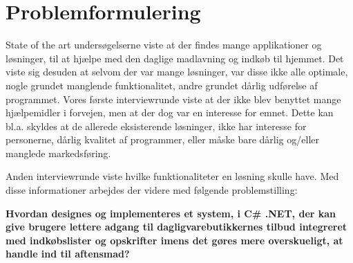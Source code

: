 \section{Problemformulering}\label{section:problemformulering}

State of the art undersøgelserne  viste at der findes mange applikationer og løsninger, til at hjælpe med den daglige madlavning og indkøb til hjemmet.
Det viste sig desuden at selvom der var mange løsninger, var disse ikke alle optimale, nogle grundet manglende funktionalitet, andre grundet dårlig udførelse af programmet.
Vores første interviewrunde viste at der ikke blev benyttet mange hjælpemidler i forvejen, men at der dog var en interesse for emnet.
Dette kan bl.a. skyldes at de allerede eksisterende løsninger, ikke har interesse for personerne, dårlig kvalitet af programmer, eller måske bare dårlig og/eller manglede markedsføring. 

Anden interviewrunde viste hvilke funktionaliteter en løsning skulle have.
Med disse informationer arbejdes der videre med følgende problemstilling:


\textbf{Hvordan designes og implementeres et system, i C\# .NET, der kan give brugere lettere adgang til dagligvarebutikkernes tilbud integreret med indkøbslister og opskrifter imens det gøres mere overskueligt, at handle ind til aftensmad? }

